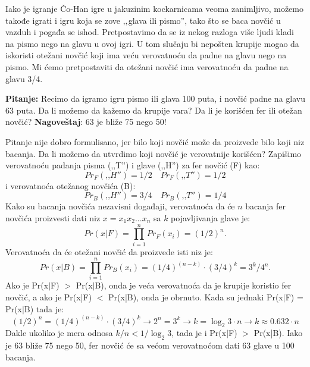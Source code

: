 Iako je igranje Čo-Han igre u jakuzinim kockarnicama veoma zanimljivo, možemo takođe igrati i igru koja se zove ‚‚glava ili pismo'', tako što se baca novčić u vazduh i pogađa se ishod. Pretpostavimo da se iz nekog razloga više ljudi kladi na pismo nego na glavu u ovoj igri. U tom slučaju bi nepošten krupije mogao da iskoristi otežani novčić koji ima veću verovatnoću da padne na glavu nego na pismo. Mi ćemo pretpostaviti da otežani novčić ima verovatnoću da padne na glavu 3/4.

\textbf{Pitanje:} Recimo da igramo igru pismo ili glava 100 puta, i novčić padne na glavu 63 puta. Da li možemo da kažemo da krupije vara? Da li je korišćen fer ili otežan novčić?
\textbf{Nagoveštaj}: 63 je bliže 75
nego 50!

Pitanje nije dobro formulisano, jer bilo koji novčić može da proizvede bilo koji niz bacanja. Da li možemo da utvrdimo koji novčić
je verovatnije korišćen? Zapišimo verovatnoću padanja pisma (‚‚T'') i glave (‚‚H'') za fer novčić (F) kao: 
\begin{equation}
Pr_F(‚‚H'') = 1/2  \quad Pr_F(‚‚T'') = 1/2
\end{equation}
i verovatnoća otežanog novčića (B):
\begin{equation}
Pr_B(‚‚H'') = 3/4  \quad Pr_B(‚‚T'') = 1/4
\end{equation}
Kako su bacanja novčića nezavisni događaji, verovatnoća da će $ n $ bacanja fer novčića proizvesti dati niz $ x= x_1x_2...x_n $ sa $ k $ pojavljivanja glave je:
\begin{equation}
Pr(x|F) = {\displaystyle \prod_{i=1}^n Pr_F(x_i)} = (1/2)^n.
\end{equation}
Verovatnoća da će otežani novčić da proizvede isti niz je:
\begin{equation}
Pr(x|B) = {\displaystyle \prod_{i=1}^n Pr_B(x_i)} = (1/4)^{(n-k)} \cdot (3/4)^k = 3^k/4^n.
\end{equation}
Ako je Pr(x$|$F) $>$ Pr(x$|$B), onda je veća verovatnoća da je krupije koristio fer novčić, a ako je Pr(x|F) $<$ Pr(x|B), onda je obrnuto.
Kada su jednaki Pr(x$|$F) = Pr(x$|$B) tada je:
\begin{equation}
(1/2)^n = (1/4)^{(n-k)} \cdot (3/4)^k \rightarrow 2^n = 3^k \rightarrow k = {\log_2 3} \cdot n \rightarrow k \approx 0.632 \cdot n
\end{equation}
Dakle ukoliko je mera odnosa $ k/n < 1/{\log_2 3}$, tada je i Pr(x$|$F) $>$ Pr(x|B).
Iako je 63 bliže 75 nego 50, fer novčić će sa većom verovatnoćom dati 63 glave u 100 bacanja.

